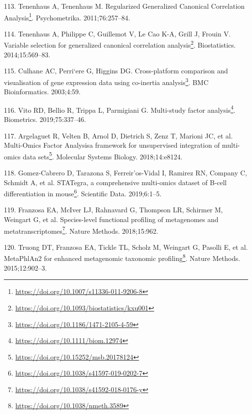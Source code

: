 \documentclass[
  a4paper,
]{book}
\DeclareRobustCommand{\href}[2]{#2\footnote{\url{#1}}}
\newlength{\cslhangindent}
\newlength{\cslentryspacingunit} %
\newenvironment{CSLReferences}[2] %
 {%
  \setlength{\parindent}{0pt}
  \ifodd #1
  \let\oldpar\par
  \def\par{\hangindent=\cslhangindent\oldpar}
  \fi
  \setlength{\parskip}{#2\cslentryspacingunit}
 }%
 {}
\begin{document}
\begin{CSLReferences}{0}{0}
\leavevmode{}%
113. Tenenhaus A, Tenenhaus M. \href{https://doi.org/10.1007/s11336-011-9206-8}{Regularized {Generalized Canonical Correlation Analysis}}. Psychometrika. 2011;76:257--84.

\leavevmode{}%
114. Tenenhaus A, Philippe C, Guillemot V, Le Cao K-A, Grill J, Frouin V. \href{https://doi.org/10.1093/biostatistics/kxu001}{Variable selection for generalized canonical correlation analysis}. Biostatistics. 2014;15:569--83.

\leavevmode{}%
115. Culhane AC, Perri`ere G, Higgins DG. \href{https://doi.org/10.1186/1471-2105-4-59}{Cross-platform comparison and visualisation of gene expression data using co-inertia analysis}. BMC Bioinformatics. 2003;4:59.

\leavevmode{}%
116. Vito RD, Bellio R, Trippa L, Parmigiani G. \href{https://doi.org/10.1111/biom.12974}{Multi-study factor analysis}. Biometrics. 2019;75:337--46.

\leavevmode{}%
117. Argelaguet R, Velten B, Arnol D, Dietrich S, Zenz T, Marioni JC, et al. \href{https://doi.org/10.15252/msb.20178124}{Multi-{Omics Factor Analysis}\textemdash{}a framework for unsupervised integration of multi-omics data sets}. Molecular Systems Biology. 2018;14:e8124.

\leavevmode{}%
118. Gomez-Cabrero D, Tarazona S, Ferreir'os-Vidal I, Ramirez RN, Company C, Schmidt A, et al. \href{https://doi.org/10.1038/s41597-019-0202-7}{{STATegra}, a comprehensive multi-omics dataset of {B}-cell differentiation in mouse}. Scientific Data. 2019;6:1--5.

\leavevmode{}%
119. Franzosa EA, McIver LJ, Rahnavard G, Thompson LR, Schirmer M, Weingart G, et al. \href{https://doi.org/10.1038/s41592-018-0176-y}{Species-level functional profiling of metagenomes and metatranscriptomes}. Nature Methods. 2018;15:962.

\leavevmode{}%
120. Truong DT, Franzosa EA, Tickle TL, Scholz M, Weingart G, Pasolli E, et al. \href{https://doi.org/10.1038/nmeth.3589}{MetaPhlAn2 for enhanced metagenomic taxonomic profiling}. Nature Methods. 2015;12:902--3.


\end{CSLReferences}
\end{document}
